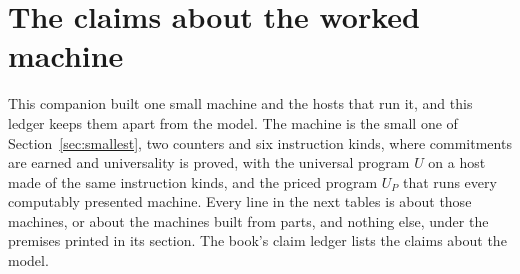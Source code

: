 \documentclass[11pt,twoside]{article}
\theoremstyle{thielethm}
\theoremstyle{thieledef}
\theoremstyle{thieledef}
\theoremstyle{thieledef}
\theoremstyle{thielethm}
\theoremstyle{thieleobs}
\theoremstyle{thielethm}
\begin{document}
\section{The claims about the worked machine}


This companion built one small machine and the hosts that run it, and this ledger keeps them apart
from the model. The machine is the small one of Section~\ref{sec:smallest}, two counters and six
instruction kinds, where commitments are earned and universality is proved, with the universal
program $U$ on a host made of the same instruction kinds, and the priced program $U_P$ that runs
every computably presented machine. Every line in the next tables is about those machines, or about
the machines built from parts, and nothing else, under the premises printed in its section. The
book's claim ledger lists the claims about the model.
\end{document}
